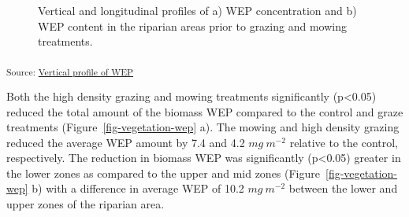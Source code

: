\documentclass[
]{agujournal2019}
\begin{document}
\begin{figure}[H]


\caption{\label{fig-vertical-wep}Vertical and longitudinal profiles of
a) WEP concentration and b) WEP content in the riparian areas prior to
grazing and mowing treatments.}

\end{figure}%

\textsubscript{Source:
\href{https://alex-koiter.github.io/riparian-grazing-manuscript/notebooks/04_Vertical_profile-preview.html\#cell-fig-vertical-WEP}{Vertical
profile of WEP}}

Both the high density grazing and mowing treatments significantly
(p\textless0.05) reduced the total amount of the biomass WEP compared to
the control and graze treatments (Figure~\ref{fig-vegetation-wep} a).
The mowing and high density grazing reduced the average WEP amount by
7.4 and 4.2 \(mg~m^{-2}\) relative to the control, respectively. The
reduction in biomass WEP was significantly (p\textless0.05) greater in
the lower zones as compared to the upper and mid zones
(Figure~\ref{fig-vegetation-wep} b) with a difference in average WEP of
10.2 \(mg~m^{-2}\) between the lower and upper zones of the riparian
area.
\end{document}
